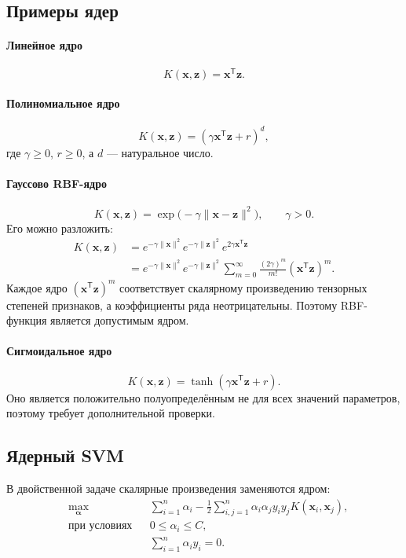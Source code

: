 \documentclass[12pt,a4paper]{article}
\theoremstyle{definition}
\newcommand{\T}{\mathsf{T}}
\newcommand{\1}{\mathbf{1}}
\begin{document}
\subsection{Примеры ядер}

\paragraph{Линейное ядро}
\[
    K(\bm{x},\bm{z})
    =
    \bm{x}^{\T}\bm{z}.
\]

\paragraph{Полиномиальное ядро}
\[
    K(\bm{x},\bm{z})
    =
    (\gamma\bm{x}^{\T}\bm{z}+r)^d,
\]
где $\gamma\geq0$, $r\geq0$, а $d$ --- натуральное число.

\paragraph{Гауссово RBF-ядро}
\[
    K(\bm{x},\bm{z})
    =
    \exp\bigl(-\gamma\|\bm{x}-\bm{z}\|^2\bigr),
    \qquad
    \gamma>0.
\]
Его можно разложить:
\begin{align*}
    K(\bm{x},\bm{z})
    &=
    e^{-\gamma\|\bm{x}\|^2}
    e^{-\gamma\|\bm{z}\|^2}
    e^{2\gamma\bm{x}^{\T}\bm{z}}\\
    &=
    e^{-\gamma\|\bm{x}\|^2}
    e^{-\gamma\|\bm{z}\|^2}
    \sum_{m=0}^{\infty}
    \frac{(2\gamma)^m}{m!}
    (\bm{x}^{\T}\bm{z})^m.
\end{align*}
Каждое ядро $(\bm{x}^{\T}\bm{z})^m$ соответствует скалярному
произведению тензорных степеней признаков, а коэффициенты ряда
неотрицательны. Поэтому RBF-функция является допустимым ядром.

\paragraph{Сигмоидальное ядро}
\[
    K(\bm{x},\bm{z})
    =
    \tanh(\gamma\bm{x}^{\T}\bm{z}+r).
\]
Оно является положительно полуопределённым не для всех значений
параметров, поэтому требует дополнительной проверки.

\subsection{Ядерный SVM}

В двойственной задаче скалярные произведения заменяются ядром:
\[
\boxed{
\begin{aligned}
    &\max_{\bm{\alpha}}
    &&
    \sum_{i=1}^{n}\alpha_i
    -
    \frac{1}{2}
    \sum_{i,j=1}^{n}
    \alpha_i\alpha_jy_iy_j
    K(\bm{x}_i,\bm{x}_j),\\
    &\text{при условиях}
    &&
    0\leq\alpha_i\leq C,\\
    &&
    &\sum_{i=1}^{n}\alpha_i y_i=0.
\end{aligned}
}
\]
\end{document}
